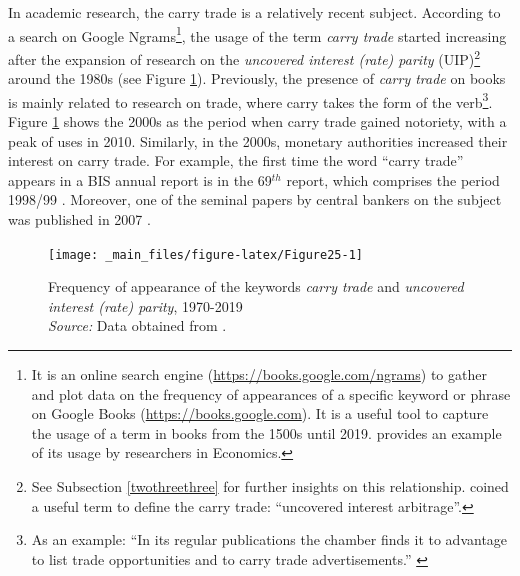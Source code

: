 \documentclass[a4paper, twoside]{templates/ociamthesis}
\begin{document}
\noindent In academic research, the carry trade is a relatively recent subject. According to a search on Google Ngrams\footnote{It is an online search engine (\url{https://books.google.com/ngrams}) to gather and plot data on the frequency of appearances of a specific keyword or phrase on Google Books (\url{https://books.google.com}). It is a useful tool to capture the usage of a term in books from the 1500s until 2019. \textcite{shiller2020} provides an example of its usage by researchers in Economics.}, the usage of the term \emph{carry trade} started increasing after the expansion of research on the \emph{uncovered interest (rate) parity} (UIP)\footnote{See Subsection \ref{twothreethree} for further insights on this relationship. \textcite[ 5]{moosa2009} coined a useful term to define the carry trade: ``uncovered interest arbitrage''.} around the 1980s (see Figure \ref{fig:Figure25}). Previously, the presence of \emph{carry trade} on books is mainly related to research on trade, where carry takes the form of the verb\footnote{As an example: ``In its regular publications the chamber finds it to advantage to list trade opportunities and to carry trade advertisements.'' \autocite[ 35]{foreigncommercedepartmentchamberofcommerceoftheunitedstates1931}}. Figure \ref{fig:Figure25} shows the 2000s as the period when carry trade gained notoriety, with a peak of uses in 2010. Similarly, in the 2000s, monetary authorities increased their interest on carry trade. For example, the first time the word ``carry trade'' appears in a BIS annual report is in the 69\(^{th}\) report, which comprises the period 1998/99 \autocite{bankforinternationalsettlements1999}. Moreover, one of the seminal papers by central bankers on the subject was published in 2007 \autocite[i.e.,][]{galati2007}.



\begin{figure}[!ht]

{\centering \texttt{[image: \_main\_files/figure-latex/Figure25-1]} 

}

\caption[Frequency of appearance of the keywords \textit{carry trade} and \textit{uncovered interest (rate) parity}, 1970-2019]{Frequency of appearance of the keywords \textit{carry trade} and \textit{uncovered interest (rate) parity}, 1970-2019 \\ \scriptsize \textit{Source:} Data obtained from \textcite{googlebooksngramviewer2021}.}\label{fig:Figure25}
\end{figure}
\end{document}
